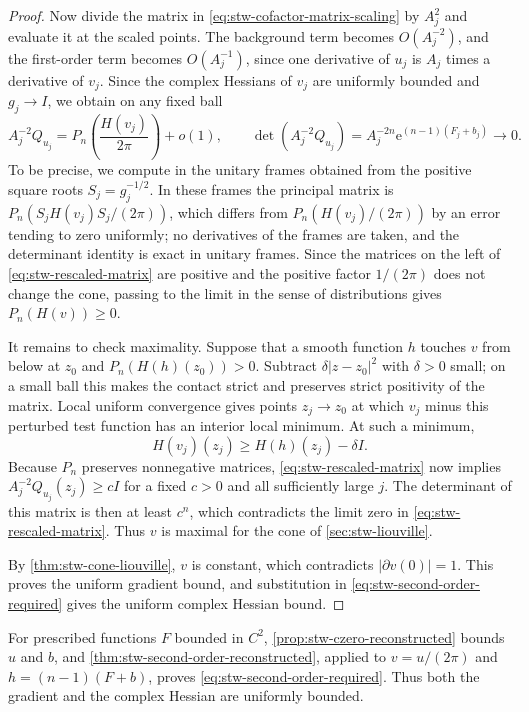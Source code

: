 \begin{proof}
Now divide the matrix in \eqref{eq:stw-cofactor-matrix-scaling} by $A_j^2$ and evaluate it at the scaled points. The background term becomes $O(A_j^{-2})$, and the first-order term becomes $O(A_j^{-1})$, since one derivative of $u_j$ is $A_j$ times a derivative of $v_j$. Since the complex Hessians of $v_j$ are uniformly bounded and $g_j\to I$, we obtain on any fixed ball
\begin{equation}\label{eq:stw-rescaled-matrix}
 A_j^{-2}Q_{u_j}
       =P_n\left(\frac{H(v_j)}{2\pi}\right)+o(1),
 \qquad
 \det(A_j^{-2}Q_{u_j})
       =A_j^{-2n}\mathrm{e}^{(n-1)(F_j+b_j)}\longrightarrow0.
\end{equation}
To be precise, we compute in the unitary frames obtained from the positive square roots $S_j=g_j^{-1/2}$. In these frames the principal matrix is $P_n(S_jH(v_j)S_j/(2\pi))$, which differs from $P_n(H(v_j)/(2\pi))$ by an error tending to zero uniformly; no derivatives of the frames are taken, and the determinant identity is exact in unitary frames. Since the matrices on the left of \eqref{eq:stw-rescaled-matrix} are positive and the positive factor $1/(2\pi)$ does not change the cone, passing to the limit in the sense of distributions gives $P_n(H(v))\geq0$.

It remains to check maximality. Suppose that a smooth function $h$ touches $v$ from below at $z_0$ and $P_n(H(h)(z_0))>0$. Subtract $\delta|z-z_0|^2$ with $\delta>0$ small; on a small ball this makes the contact strict and preserves strict positivity of the matrix. Local uniform convergence gives points $z_j\to z_0$ at which $v_j$ minus this perturbed test function has an interior local minimum. At such a minimum,
\[
 H(v_j)(z_j)\geq H(h)(z_j)-\delta I.
\]
Because $P_n$ preserves nonnegative matrices, \eqref{eq:stw-rescaled-matrix} now implies $A_j^{-2}Q_{u_j}(z_j)\geq cI$ for a fixed $c>0$ and all sufficiently large $j$. The determinant of this matrix is then at least $c^n$, which contradicts the limit zero in \eqref{eq:stw-rescaled-matrix}. Thus $v$ is maximal for the cone of \cref{sec:stw-liouville}.

By \cref{thm:stw-cone-liouville}, $v$ is constant, which contradicts $|\partial v(0)|=1$. This proves the uniform gradient bound, and substitution in \eqref{eq:stw-second-order-required} gives the uniform complex Hessian bound.
\end{proof}

For prescribed functions $F$ bounded in $C^2$, \cref{prop:stw-czero-reconstructed} bounds $u$ and $b$, and \cref{thm:stw-second-order-reconstructed}, applied to $v=u/(2\pi)$ and $h=(n-1)(F+b)$, proves \eqref{eq:stw-second-order-required}. Thus both the gradient and the complex Hessian are uniformly bounded.
